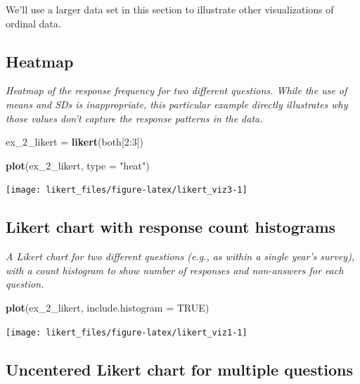 \documentclass[]{book}
\newenvironment{Shaded}{\begin{snugshade}}{\end{snugshade}}
\newcommand{\KeywordTok}[1]{\textcolor[rgb]{0.13,0.29,0.53}{\textbf{{#1}}}}
\newcommand{\DataTypeTok}[1]{\textcolor[rgb]{0.13,0.29,0.53}{{#1}}}
\newcommand{\DecValTok}[1]{\textcolor[rgb]{0.00,0.00,0.81}{{#1}}}
\newcommand{\StringTok}[1]{\textcolor[rgb]{0.31,0.60,0.02}{{#1}}}
\newcommand{\OtherTok}[1]{\textcolor[rgb]{0.56,0.35,0.01}{{#1}}}
\newcommand{\NormalTok}[1]{{#1}}
\begin{document}
We'll use a larger data set in this section to illustrate other
visualizations of ordinal data.

\subsection{Heatmap}\label{heatmap}

\emph{Heatmap of the response frequency for two different questions.
While the use of means and SDs is inappropriate, this particular example
directly illustrates why those values don't capture the response
patterns in the data.}

\begin{Shaded}
\begin{Highlighting}[]
\NormalTok{ex_2_likert =}\StringTok{ }\KeywordTok{likert}\NormalTok{(both[}\DecValTok{2}\NormalTok{:}\DecValTok{3}\NormalTok{])}

\KeywordTok{plot}\NormalTok{(ex_2_likert, }\DataTypeTok{type =} \StringTok{"heat"}\NormalTok{)}
\end{Highlighting}
\end{Shaded}

\begin{center}\texttt{[image: likert\_files/figure-latex/likert\_viz3-1]} \end{center}

\subsection{Likert chart with response count
histograms}\label{likert-chart-with-response-count-histograms}

\emph{A Likert chart for two different questions (e.g., as within a
single year's survey), with a count histogram to show number of
responses and non-answers for each question.}

\begin{Shaded}
\begin{Highlighting}[]
\KeywordTok{plot}\NormalTok{(ex_2_likert, }\DataTypeTok{include.histogram =} \OtherTok{TRUE}\NormalTok{)}
\end{Highlighting}
\end{Shaded}

\begin{center}\texttt{[image: likert\_files/figure-latex/likert\_viz1-1]} \end{center}

\subsection{Uncentered Likert chart for multiple
questions}\label{uncentered-likert-chart-for-multiple-questions}
\end{document}
